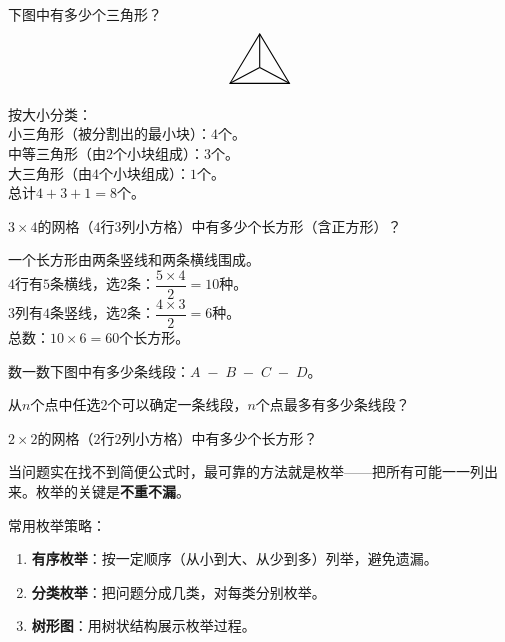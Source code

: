\begin{example}
下图中有多少个三角形？
\[
\begin{tikzpicture}[scale=0.5]
\draw[thick] (0,0) -- (3,0) -- (1.5,2.5) -- cycle;
\draw[thick] (0,0) -- (1.5,0.8);
\draw[thick] (1.5,0.8) -- (3,0);
\draw[thick] (1.5,0.8) -- (1.5,2.5);
\end{tikzpicture}
\]
\end{example}
\begin{solution}
按大小分类：\\
小三角形（被分割出的最小块）：$4$个。\\
中等三角形（由$2$个小块组成）：$3$个。\\
大三角形（由$4$个小块组成）：$1$个。\\
总计$4+3+1=8$个。
\end{solution}

\begin{example}
$3\times4$的网格（$4$行$3$列小方格）中有多少个长方形（含正方形）？
\end{example}
\begin{solution}
一个长方形由两条竖线和两条横线围成。\\
$4$行有$5$条横线，选$2$条：$\dfrac{5\times4}{2}=10$种。\\
$3$列有$4$条竖线，选$2$条：$\dfrac{4\times3}{2}=6$种。\\
总数：$10\times6=60$个长方形。
\end{solution}

\begin{exercise}
\item 数一数下图中有多少条线段：$A\;-\;B\;-\;C\;-\;D$。
\item 从$n$个点中任选$2$个可以确定一条线段，$n$个点最多有多少条线段？
\item $2\times2$的网格（$2$行$2$列小方格）中有多少个长方形？
\end{exercise}


当问题实在找不到简便公式时，最可靠的方法就是枚举——把所有可能一一列出来。枚举的关键是\textbf{不重不漏}。

常用枚举策略：
\begin{enumerate}
\item \textbf{有序枚举}：按一定顺序（从小到大、从少到多）列举，避免遗漏。
\item \textbf{分类枚举}：把问题分成几类，对每类分别枚举。
\item \textbf{树形图}：用树状结构展示枚举过程。
\end{enumerate}

